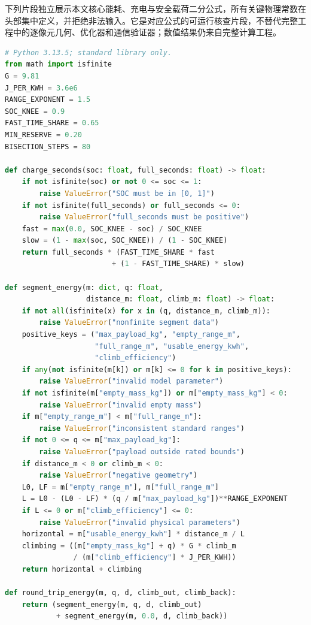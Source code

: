 \documentclass[a4paper]{my_paper}%
\numberwithin{equation}{section}
\theoremstyle{definition}
\begin{document}
下列片段独立展示本文核心能耗、充电与安全载荷二分公式，所有关键物理常数在头部集中定义，并拒绝非法输入。它是对应公式的可运行核查片段，不替代完整工程中的逐像元几何、优化器和通信验证器；数值结果仍来自完整计算工程。
\begin{lstlisting}[language=Python,label=lst:physics,caption={核心能耗与充电规则的最小可运行核查片段}]
# Python 3.13.5; standard library only.
from math import isfinite
G = 9.81
J_PER_KWH = 3.6e6
RANGE_EXPONENT = 1.5
SOC_KNEE = 0.9
FAST_TIME_SHARE = 0.65
MIN_RESERVE = 0.20
BISECTION_STEPS = 80

def charge_seconds(soc: float, full_seconds: float) -> float:
    if not isfinite(soc) or not 0 <= soc <= 1:
        raise ValueError("SOC must be in [0, 1]")
    if not isfinite(full_seconds) or full_seconds <= 0:
        raise ValueError("full_seconds must be positive")
    fast = max(0.0, SOC_KNEE - soc) / SOC_KNEE
    slow = (1 - max(soc, SOC_KNEE)) / (1 - SOC_KNEE)
    return full_seconds * (FAST_TIME_SHARE * fast
                         + (1 - FAST_TIME_SHARE) * slow)

def segment_energy(m: dict, q: float,
                   distance_m: float, climb_m: float) -> float:
    if not all(isfinite(x) for x in (q, distance_m, climb_m)):
        raise ValueError("nonfinite segment data")
    positive_keys = ("max_payload_kg", "empty_range_m",
                     "full_range_m", "usable_energy_kwh",
                     "climb_efficiency")
    if any(not isfinite(m[k]) or m[k] <= 0 for k in positive_keys):
        raise ValueError("invalid model parameter")
    if not isfinite(m["empty_mass_kg"]) or m["empty_mass_kg"] < 0:
        raise ValueError("invalid empty mass")
    if m["empty_range_m"] < m["full_range_m"]:
        raise ValueError("inconsistent standard ranges")
    if not 0 <= q <= m["max_payload_kg"]:
        raise ValueError("payload outside rated bounds")
    if distance_m < 0 or climb_m < 0:
        raise ValueError("negative geometry")
    L0, LF = m["empty_range_m"], m["full_range_m"]
    L = L0 - (L0 - LF) * (q / m["max_payload_kg"])**RANGE_EXPONENT
    if L <= 0 or m["climb_efficiency"] <= 0:
        raise ValueError("invalid physical parameters")
    horizontal = m["usable_energy_kwh"] * distance_m / L
    climbing = ((m["empty_mass_kg"] + q) * G * climb_m
                / (m["climb_efficiency"] * J_PER_KWH))
    return horizontal + climbing

def round_trip_energy(m, q, d, climb_out, climb_back):
    return (segment_energy(m, q, d, climb_out)
            + segment_energy(m, 0.0, d, climb_back))


\end{lstlisting}
\end{document}
